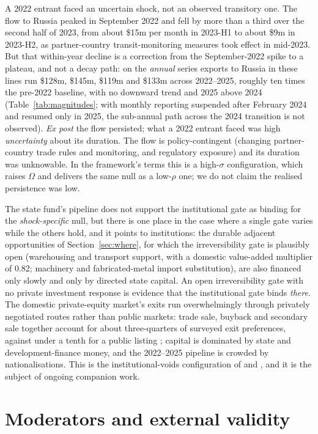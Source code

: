 \documentclass[12pt]{article}
\begin{document}
A 2022 entrant faced an uncertain shock, not an observed transitory one. The flow to Russia
peaked in September 2022 and fell by more than a third over the second half of 2023, from
about \$15m per month in 2023-H1 to about \$9m in 2023-H2, as partner-country transit-monitoring measures took effect in mid-2023. But that within-year decline is a correction
from the September-2022 spike to a plateau, and not a decay path: on the \emph{annual} series
exports to Russia in these lines run \$128m, \$145m, \$119m and \$133m across 2022--2025,
roughly ten times the pre-2022 baseline, with no downward trend and 2025 above 2024
(Table~\ref{tab:magnitudes}; with monthly reporting suspended after February 2024 and resumed
only in 2025, the sub-annual path across the 2024 transition is not observed). \emph{Ex post} the flow
persisted; what a 2022 entrant faced was high \emph{uncertainty} about its duration. The flow
is policy-contingent (changing partner-country trade rules and monitoring, and regulatory exposure) and its duration was unknowable. In the framework's terms this is a high-$\sigma$
configuration, which raises $\Omega$ and delivers the same null as a low-$\rho$ one; we do not
claim the realised persistence was low.

The state fund's pipeline does not support the institutional gate as binding for the \emph{shock-specific} null, but there is one place in
the case where a single gate varies while the others hold, and it points to institutions: the
durable adjacent opportunities of Section~\ref{sec:where}, for which the irreversibility gate
is plausibly open (warehousing and transport support, with a domestic value-added multiplier
of 0.82; machinery and fabricated-metal import substitution), are also financed only slowly
and only by directed state capital. An open irreversibility gate with no private investment
response is evidence that the institutional gate binds \emph{there}. The domestic
private-equity market's exits run overwhelmingly through privately negotiated routes rather
than public markets: trade sale, buyback and secondary sale together account for about
three-quarters of surveyed exit preferences, against under a tenth for a public listing
\citep{qicaifcifc2026pe}; capital is dominated by state and
development-finance money, and the 2022--2025 pipeline is crowded by nationalisations. This is
the institutional-voids configuration of \citet{khannapalepu2000} and \citet{rajanzingales1998}, and
it is the subject of ongoing companion work.

\section{Moderators and external validity}\label{sec:moderators}
\end{document}
